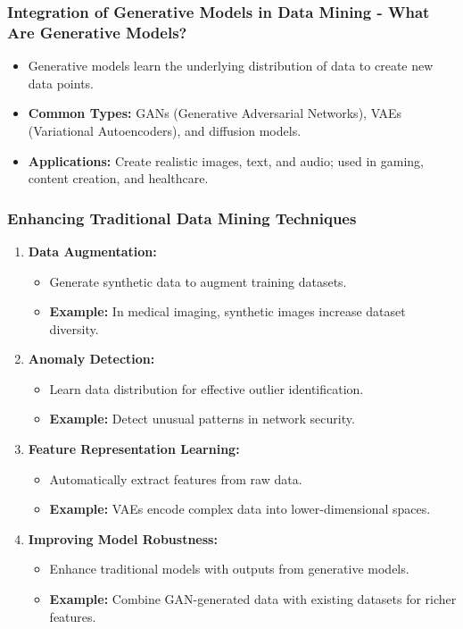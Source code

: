 \documentclass[aspectratio=169]{beamer}
\begin{document}
\begin{frame}[fragile]
    \frametitle{Integration of Generative Models in Data Mining - What Are Generative Models?}
    \begin{itemize}
        \item Generative models learn the underlying distribution of data to create new data points.
        \item \textbf{Common Types:} GANs (Generative Adversarial Networks), VAEs (Variational Autoencoders), and diffusion models.
        \item \textbf{Applications:} Create realistic images, text, and audio; used in gaming, content creation, and healthcare.
    \end{itemize}
\end{frame}

\begin{frame}[fragile]
    \frametitle{Enhancing Traditional Data Mining Techniques}
    \begin{enumerate}
        \item \textbf{Data Augmentation:} 
            \begin{itemize}
                \item Generate synthetic data to augment training datasets.
                \item \textbf{Example:} In medical imaging, synthetic images increase dataset diversity.
            \end{itemize}
        
        \item \textbf{Anomaly Detection:} 
            \begin{itemize}
                \item Learn data distribution for effective outlier identification.
                \item \textbf{Example:} Detect unusual patterns in network security.
            \end{itemize}
        
        \item \textbf{Feature Representation Learning:} 
            \begin{itemize}
                \item Automatically extract features from raw data.
                \item \textbf{Example:} VAEs encode complex data into lower-dimensional spaces.
            \end{itemize}
        
        \item \textbf{Improving Model Robustness:} 
            \begin{itemize}
                \item Enhance traditional models with outputs from generative models.
                \item \textbf{Example:} Combine GAN-generated data with existing datasets for richer features.
            \end{itemize}
    \end{enumerate}
\end{frame}
\end{document}
